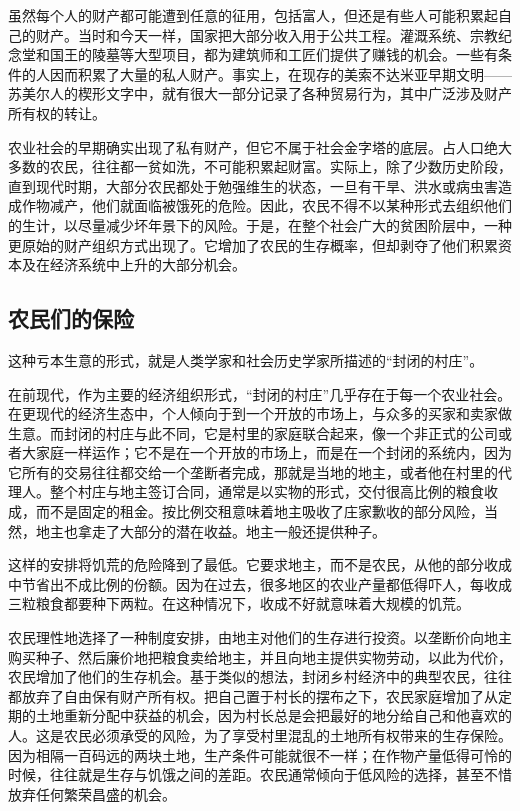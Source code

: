 虽然每个人的财产都可能遭到任意的征用，包括富人，但还是有些人可能积累起自己的财产。当时和今天一样，国家把大部分收入用于公共工程。灌溉系统、宗教纪念堂和国王的陵墓等大型项目，都为建筑师和工匠们提供了赚钱的机会。一些有条件的人因而积累了大量的私人财产。事实上，在现存的美索不达米亚早期文明——苏美尔人的楔形文字中，就有很大一部分记录了各种贸易行为，其中广泛涉及财产所有权的转让。

农业社会的早期确实出现了私有财产，但它不属于社会金字塔的底层。占人口绝大多数的农民，往往都一贫如洗，不可能积累起财富。实际上，除了少数历史阶段，直到现代时期，大部分农民都处于勉强维生的状态，一旦有干旱、洪水或病虫害造成作物减产，他们就面临被饿死的危险。因此，农民不得不以某种形式去组织他们的生计，以尽量减少坏年景下的风险。于是，在整个社会广大的贫困阶层中，一种更原始的财产组织方式出现了。它增加了农民的生存概率，但却剥夺了他们积累资本及在经济系统中上升的大部分机会。

\subsection{农民们的保险}
这种亏本生意的形式，就是人类学家和社会历史学家所描述的“封闭的村庄”。

在前现代，作为主要的经济组织形式，“封闭的村庄”几乎存在于每一个农业社会。在更现代的经济生态中，个人倾向于到一个开放的市场上，与众多的买家和卖家做生意。而封闭的村庄与此不同，它是村里的家庭联合起来，像一个非正式的公司或者大家庭一样运作；它不是在一个开放的市场上，而是在一个封闭的系统内，因为它所有的交易往往都交给一个垄断者完成，那就是当地的地主，或者他在村里的代理人。整个村庄与地主签订合同，通常是以实物的形式，交付很高比例的粮食收成，而不是固定的租金。按比例交租意味着地主吸收了庄家歉收的部分风险，当然，地主也拿走了大部分的潜在收益。地主一般还提供种子。

这样的安排将饥荒的危险降到了最低。它要求地主，而不是农民，从他的部分收成中节省出不成比例的份额。因为在过去，很多地区的农业产量都低得吓人，每收成三粒粮食都要种下两粒。在这种情况下，收成不好就意味着大规模的饥荒。

农民理性地选择了一种制度安排，由地主对他们的生存进行投资。以垄断价向地主购买种子、然后廉价地把粮食卖给地主，并且向地主提供实物劳动，以此为代价，农民增加了他们的生存机会。基于类似的想法，封闭乡村经济中的典型农民，往往都放弃了自由保有财产所有权。把自己置于村长的摆布之下，农民家庭增加了从定期的土地重新分配中获益的机会，因为村长总是会把最好的地分给自己和他喜欢的人。这是农民必须承受的风险，为了享受村里混乱的土地所有权带来的生存保险。因为相隔一百码远的两块土地，生产条件可能就很不一样；在作物产量低得可怜的时候，往往就是生存与饥饿之间的差距。农民通常倾向于低风险的选择，甚至不惜放弃任何繁荣昌盛的机会。

